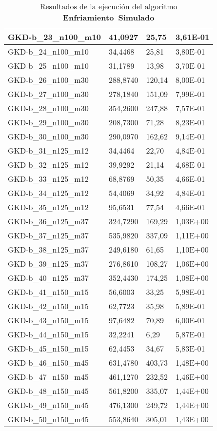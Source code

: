 \begin{table}[!ht]
\begin{adjustbox}{height=12cm}
\begin{tabular}{|l|l|l|l|}
		GKD-b\_23\_n100\_m10 & 41,0927  & 25,75  & 3,61E-01 \\ \hline
		GKD-b\_24\_n100\_m10 & 34,4468  & 25,81  & 3,80E-01 \\ \hline
		GKD-b\_25\_n100\_m10 & 31,1789  & 13,98  & 3,70E-01 \\ \hline
		GKD-b\_26\_n100\_m30 & 288,8740 & 120,14 & 8,00E-01 \\ \hline
		GKD-b\_27\_n100\_m30 & 278,1840 & 151,09 & 7,99E-01 \\ \hline
		GKD-b\_28\_n100\_m30 & 354,2600 & 247,88 & 7,57E-01 \\ \hline
		GKD-b\_29\_n100\_m30 & 208,7300 & 71,28  & 8,23E-01 \\ \hline
		GKD-b\_30\_n100\_m30 & 290,0970 & 162,62 & 9,14E-01 \\ \hline
		GKD-b\_31\_n125\_m12 & 34,4464  & 22,70  & 4,84E-01 \\ \hline
		GKD-b\_32\_n125\_m12 & 39,9292  & 21,14  & 4,68E-01 \\ \hline
		GKD-b\_33\_n125\_m12 & 68,8769  & 50,35  & 4,66E-01 \\ \hline
		GKD-b\_34\_n125\_m12 & 54,4069  & 34,92  & 4,84E-01 \\ \hline
		GKD-b\_35\_n125\_m12 & 95,6531  & 77,54  & 4,66E-01 \\ \hline
		GKD-b\_36\_n125\_m37 & 324,7290 & 169,29 & 1,03E+00 \\ \hline
		GKD-b\_37\_n125\_m37 & 535,9820 & 337,09 & 1,11E+00 \\ \hline
		GKD-b\_38\_n125\_m37 & 249,6180 & 61,65  & 1,10E+00 \\ \hline
		GKD-b\_39\_n125\_m37 & 276,8610 & 108,27 & 1,06E+00 \\ \hline
		GKD-b\_40\_n125\_m37 & 352,4430 & 174,25 & 1,08E+00 \\ \hline
		GKD-b\_41\_n150\_m15 & 56,6003  & 33,25  & 5,98E-01 \\ \hline
		GKD-b\_42\_n150\_m15 & 62,7723  & 35,98  & 5,89E-01 \\ \hline
		GKD-b\_43\_n150\_m15 & 97,6482  & 70,89  & 6,00E-01 \\ \hline
		GKD-b\_44\_n150\_m15 & 32,2241  & 6,29   & 5,87E-01 \\ \hline
		GKD-b\_45\_n150\_m15 & 62,4453  & 34,67  & 5,83E-01 \\ \hline
		GKD-b\_46\_n150\_m45 & 631,4780 & 403,73 & 1,48E+00 \\ \hline
		GKD-b\_47\_n150\_m45 & 461,1270 & 232,52 & 1,46E+00 \\ \hline
		GKD-b\_48\_n150\_m45 & 561,8200 & 335,07 & 1,44E+00 \\ \hline
		GKD-b\_49\_n150\_m45 & 476,1300 & 249,72 & 1,44E+00 \\ \hline
		GKD-b\_50\_n150\_m45 & 553,8640 & 305,01 & 1,43E+00 \\ \hline
    \end{tabular}
    \end{adjustbox}
    \caption{Resultados de la ejecución del algoritmo \textbf{Enfriamiento~Simulado}}
\end{table}

\pagebreak